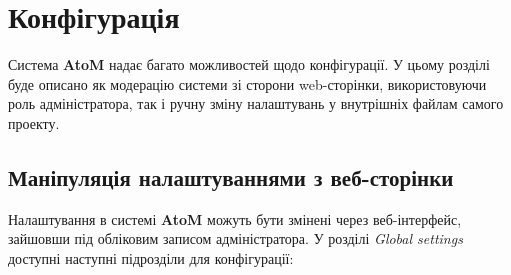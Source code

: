 \documentclass[14pt,a4paper]{article}
\begin{document}
\section{Конфігурація}
\begin{large}
Система \textbf{AtoM} надає багато можливостей щодо конфігурації. У цьому розділі буде описано як модерацію системи зі сторони web-сторінки, використовуючи роль адміністратора, так і ручну зміну налаштувань у внутрішніх файлам самого проекту.

\subsection{Маніпуляція налаштуваннями з веб-сторінки}

Налаштування в системі \textbf{AtoM} можуть бути змінені через веб-інтерфейс, зайшовши під обліковим записом адміністратора. У розділі \textit{Global settings} доступні наступні підрозділи для конфігурації:


\end{large}
\end{document}
